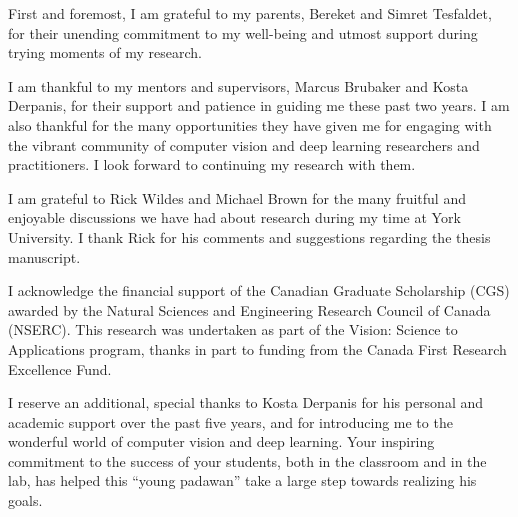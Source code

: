 \begin{acknowledgements}
\thispagestyle{plain}
\setcounter{page}{2}
First and foremost, I am grateful to my parents, Bereket and Simret Tesfaldet, for their unending commitment to my well-being and utmost support during trying moments of my research.

I am thankful to my mentors and supervisors, Marcus Brubaker and Kosta Derpanis, for their support and patience in guiding me these past two years. I am also thankful for the many opportunities they have given me for engaging with the vibrant community of computer vision and deep learning researchers and practitioners. I look forward to continuing my research with them.

I am grateful to Rick Wildes and Michael Brown for the many fruitful and enjoyable discussions we have had about research during my time at York University. I thank Rick for his comments and suggestions regarding the thesis manuscript.

I acknowledge the financial support of the Canadian Graduate Scholarship (CGS) awarded by the Natural Sciences and Engineering Research Council of Canada (NSERC). This research was undertaken as part of the Vision: Science to Applications program, thanks in part to funding from the Canada First Research Excellence Fund.

I reserve an additional, special thanks to Kosta Derpanis for his personal and academic support over the past five years, and for introducing me to the wonderful world of computer vision and deep learning. Your inspiring commitment to the success of your students, both in the classroom and in the lab, has helped this ``young padawan'' take a large step towards realizing his goals.
\end{acknowledgements}